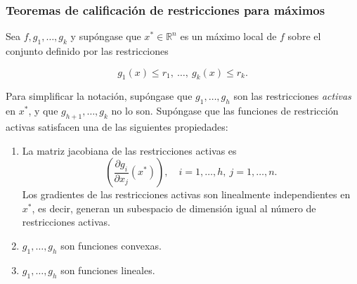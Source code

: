 \documentclass{article}
\begin{document}
\subsubsection*{Teoremas de calificación de restricciones para máximos}


Sea $f, g_1, \ldots, g_k$ y supóngase que 
$x^* \in \mathbb{R}^n$ es un máximo local de $f$ sobre el conjunto definido por las restricciones

\[
g_1(x) \le r_1, \ \ldots,\ g_k(x) \le r_k.
\]

Para simplificar la notación, supóngase que $g_1,\ldots,g_h$ son las restricciones \textit{activas} en $x^*$,
y que $g_{h+1},\ldots,g_k$ no lo son. 
Supóngase que las funciones de restricción activas satisfacen una de las siguientes propiedades:

\begin{enumerate}[label=(\alph*)] \color{teal}
\item
La matriz jacobiana de las restricciones activas es
\[
\left( \frac{\partial g_i}{\partial x_j}(x^*) \right),
\quad i=1,\ldots,h,\ j=1,\ldots,n.
\]
Los gradientes de las restricciones activas son linealmente independientes en 
$x^*$, es decir, generan un subespacio de dimensión igual al número de restricciones activas.




\item $g_1,\ldots,g_h$ son funciones convexas.

\item $g_1,\ldots,g_h$ son funciones lineales.
\end{enumerate}
\end{document}
